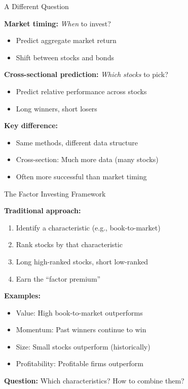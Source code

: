 \documentclass[10pt]{beamer}
\begin{document}
\begin{frame}{A Different Question}

\textbf{Market timing:} \emph{When} to invest?
\begin{itemize}
  \item Predict aggregate market return
  \item Shift between stocks and bonds
\end{itemize}

\vspace{1em}
\textbf{Cross-sectional prediction:} \emph{Which stocks} to pick?
\begin{itemize}
  \item Predict relative performance across stocks
  \item Long winners, short losers
\end{itemize}

\vspace{1em}
\textbf{Key difference:}
\begin{itemize}
  \item Same methods, different data structure
  \item Cross-section: Much more data (many stocks)
  \item Often more successful than market timing
\end{itemize}

\end{frame}


\begin{frame}{The Factor Investing Framework}

\textbf{Traditional approach:}
\begin{enumerate}
  \item Identify a characteristic (e.g., book-to-market)
  \item Rank stocks by that characteristic
  \item Long high-ranked stocks, short low-ranked
  \item Earn the ``factor premium''
\end{enumerate}

\vspace{1em}
\textbf{Examples:}
\begin{itemize}
  \item Value: High book-to-market outperforms
  \item Momentum: Past winners continue to win
  \item Size: Small stocks outperform (historically)
  \item Profitability: Profitable firms outperform
\end{itemize}

\vspace{1em}
\textbf{Question:} Which characteristics? How to combine them?

\end{frame}
\end{document}
